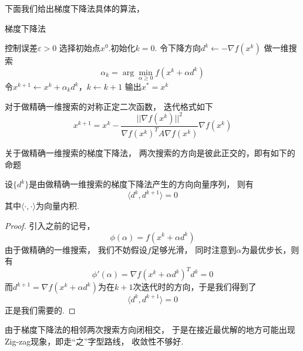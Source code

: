 下面我们给出梯度下降法具体的算法，
\begin{algorithm}[H]
\caption{梯度下降法}%
\begin{algorithmic}[1]%
\Require 控制误差$\varepsilon > 0$
\State 选择初始点$x^0$.初始化$k = 0$.
\State 令下降方向$d^k\leftarrow -\nabla f(x^k)$
\State 做一维搜索
\begin{equation*}
	\alpha_k = \arg\min_{\alpha\geq 0} f(x^k + \alpha d^k)
\end{equation*}
\State 令$x^{k+1}\leftarrow x^k + \alpha_k d^k$，$k\leftarrow k+1$
\EndWhile
\State 输出$x^* = x^k$
\end{algorithmic}  
\end{algorithm}
\begin{note}
	对于做精确一维搜索的对称正定二次函数， 迭代格式如下
	\begin{equation*}
		x^{k+1} = x^k - \frac{||\nabla f(x^k)||^2}{\nabla f(x^k)^T A \nabla f(x^k)} \nabla f(x^k)
	\end{equation*}
\end{note}
关于做精确一维搜索的梯度下降法， 两次搜索的方向是彼此正交的，即有如下的命题
\begin{proposition}
	设$\{d^k\}$是由做精确一维搜索的梯度下降法产生的方向向量序列， 则有
	\begin{equation*}
		\langle d^k, d^{k+1}\rangle = 0 
	\end{equation*}
	其中$\langle \cdot, \cdot \rangle$为向量内积.
\end{proposition}
\begin{proof}
	引入之前的记号，
	\begin{equation*}
		\phi(\alpha) = f(x^k + \alpha d^k)
	\end{equation*}
	由于做精确的一维搜索， 我们不妨假设$f$足够光滑， 同时注意到$\alpha$为最优步长，则有
	\begin{equation*}
		\phi'(\alpha) = \nabla f(x^k + \alpha d^k)^T d^k = 0
	\end{equation*}
	而$d^{k+1} = \nabla f(x^k + \alpha d^k)$为在$k+1$次迭代时的方向，于是我们得到了
	\begin{equation*}
		\langle d^k, d^{k+1}\rangle = 0 
	\end{equation*}
	正是我们需要的.
\end{proof}
\begin{note}
	由于梯度下降法的相邻两次搜索方向闭相交， 于是在接近最优解的地方可能出现Zig-zag现象，即走“之”字型路线， 收敛性不够好.
\end{note}
